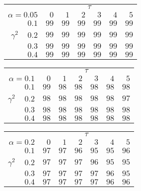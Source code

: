 \begin{tabular}{r|rrrrrr}
\hline\hline
 &\multicolumn{6}{c}{$\tau$} \\ 
 $\alpha = 0.05$ & $0$ & $1$ & $2$ & $3$ & $4$ & $5$ \\ 
 \hline$0.1$ & $99$ & $99$ & $99$ & $99$ & $99$ & $99$\\ 
$\gamma^2\;\;\;$ $0.2$ & $99$ & $99$ & $99$ & $99$ & $99$ & $99$\\ 
$0.3$ & $99$ & $99$ & $99$ & $99$ & $99$ & $99$\\ 
$0.4$ & $99$ & $99$ & $99$ & $99$ & $99$ & $99$\\ 
 \hline 
 \end{tabular}
 
 \vspace{2em} 
 
\begin{tabular}{r|rrrrrr}
\hline\hline
 &\multicolumn{6}{c}{$\tau$} \\ 
 $\alpha = 0.1$ & $0$ & $1$ & $2$ & $3$ & $4$ & $5$ \\ 
 \hline$0.1$ & $99$ & $98$ & $98$ & $98$ & $98$ & $98$\\ 
$\gamma^2\;\;\;$ $0.2$ & $98$ & $98$ & $98$ & $98$ & $98$ & $97$\\ 
$0.3$ & $98$ & $98$ & $98$ & $98$ & $98$ & $98$\\ 
$0.4$ & $98$ & $98$ & $98$ & $98$ & $98$ & $98$\\ 
 \hline 
 \end{tabular}
 
 \vspace{2em} 
 
\begin{tabular}{r|rrrrrr}
\hline\hline
 &\multicolumn{6}{c}{$\tau$} \\ 
 $\alpha = 0.2$ & $0$ & $1$ & $2$ & $3$ & $4$ & $5$ \\ 
 \hline$0.1$ & $97$ & $97$ & $96$ & $95$ & $95$ & $96$\\ 
$\gamma^2\;\;\;$ $0.2$ & $97$ & $97$ & $97$ & $96$ & $95$ & $95$\\ 
$0.3$ & $97$ & $97$ & $97$ & $97$ & $96$ & $95$\\ 
$0.4$ & $97$ & $97$ & $97$ & $97$ & $96$ & $96$\\ 
 \hline 
 \end{tabular}